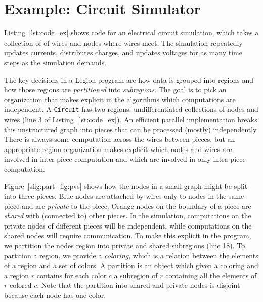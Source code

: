 \section{Example: Circuit Simulator}
\label{sec:ex}

Listing~\ref{lst:code_ex} shows code for an electrical
circuit simulation, which takes a collection of
of wires and nodes where wires meet.  
The simulation repeatedly updates
currents, distributes charges, and updates voltages for as many
time steps as the simulation demands.  

The key decisions in a Legion program are how data is grouped into
regions and how those regions are {\em partitioned} into {\em
subregions}.  The goal is to pick an organization that makes explicit
in the algorithms which computations are independent.  A {\tt Circuit}
has two regions: undifferentiated collections of nodes and wires (line
3 of Listing~\ref{lst:code_ex}). An efficient parallel
implementation breaks this unstructured graph into pieces that can be
processed (mostly) independently. There is always some computation
across the wires between pieces, but an appropriate
region organization makes explicit which nodes and wires are
involved in inter-piece computation and which are involved in only
intra-piece computation.

%
Figure~\ref{sfig:part_fig:pvs} shows how the nodes
in a small graph might be split into three pieces.  Blue nodes are
attached by wires only to nodes in the same piece and are 
{\em private} to the piece.  Orange nodes on the boundary of a
piece are {\em shared} with (connected to) other pieces.
In the simulation, computations on the
private nodes of different pieces will be independent, while
computations on the shared nodes will require communication.  To make
this explicit in the program, we partition the nodes region into
private and shared subregions (line 18).  To partition a region, we
provide a {\em coloring}, which is a relation between the elements of
a region and a set of colors.  A partition is an object which given a
coloring and a region $r$ contains for each color $c$ a subregion of
$r$ containing all the elements of $r$ colored $c$. Note that the
partition into shared and private nodes is disjoint because each node has one color.

